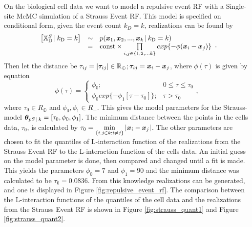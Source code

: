 \section{}
\label{sec:problem4}

On the biological cell data we want to model a repulsive event RF with a Single-site McMC simulation of a Strauss Event RF. This model is specified on conditional form, given the event count $k_D = k$, realizations can be found by
%
\begin{equation}
    \begin{array}{rcl}
        \left[\mathbb{X}_\textrm{D}^S \, | \, k_\textrm{D} = k\right] & \sim & p(\bm{x}_1,\bm{x}_2,...,\bm{x}_k \, | \, k_\textrm{D} = k) \\
         & = & \mathrm{const} \times \prod\limits_{i,j\in \{1,2,...k\}} exp\{-\phi(\bm{x}_i-\bm{x}_j)\}
    \end{array}.
    \label{eq:straureal}
\end{equation}
%
Then let the distance be $\tau_{ij} = |\bm{\tau}_{ij}| \in \mathbb{R}_\oplus; \bm{\tau}_{ij} = \bm{x}_i - \bm{x}_j$, where $\phi(\tau)$ is given by equation 
\begin{equation}
    \phi(\tau) = \begin{cases}
                    \phi_0; & 0 \leq \tau \leq \tau_0\\
                    \phi_0 exp\{-\phi_1[\tau-\tau_0]\}; & \tau > \tau_0
                \end{cases},
    \label{eq:interfunction}
\end{equation}
where $\tau_0 \in R_\oplus$ and $\phi_0,\phi_1 \in R_+$. This gives the model parameters for the Strauss-model $\bm{\theta} _{pS\, | \, k} = [\tau_0,\phi_0,\phi_1]$. The minimum distance between the points in the cells data, $\tau_0$, is calculated by $\tau_0 = \min\limits_{\{i,j\in k;i\neq j\}} |\bm{x}_i-\bm{x}_j|$. The other parameters are chosen to fit the quantiles of L-interaction function of the realizations from the Strauss Event RF to the L-interaction function of the cells data. An initial guess on the model parameter is done, then compared and changed until a fit is made. This yields the parameters  $\phi_0 = 7$ and $\phi_1 = 90$ and the minimum distance was calculated to be $\tau_0 = 0.0836$. From this knowledge realizations can be generated, and one is displayed in Figure \ref{fig:repulsive_event_rf}. The comparison between the L-interaction functions of the quantiles of the cell data and the realizations from the Strauss Event RF is shown in Figure \ref{fig:strauss_quant1} and  Figure \ref{fig:strauss_quant2}. 

